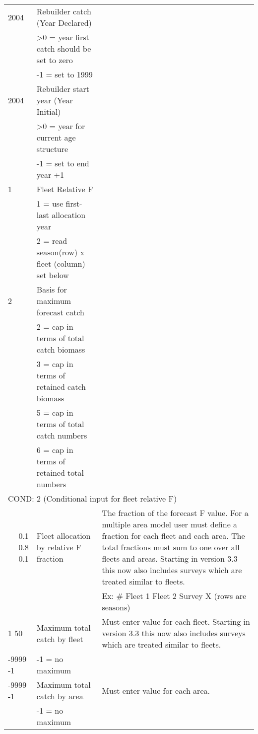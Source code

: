 \begin{landscape}
\begin{longtable}{p{3cm} p{7cm} p{11cm}}
 \hline
 2004 & Rebuilder catch (Year Declared) & \\
      & >0 = year first catch should be set to zero & \\
      & -1 = set to 1999 & \\
      
 \hline
 2004 & Rebuilder start year (Year Initial) & \\
      & >0 = year for current age structure & \\
      & -1 = set to end year +1 & \\
      
 \hline
 1 & Fleet Relative F & \\
   & 1 = use first-last allocation year & \\
   & 2 = read season(row) x fleet (column) set below & \\
   
 \hline
 2 & Basis for maximum forecast catch &  \\
   & 2 = cap in terms of total catch biomass & \\
   & 3 = cap in terms of retained catch biomass & \\
   & 5 = cap in terms of total catch numbers & \\
   & 6 = cap in terms of retained total numbers & \\
 
 \hline  
 \multicolumn{3}{l}{COND: 2 (Conditional input for fleet relative F)} \\
 \multicolumn{1}{r}{0.1 0.8 0.1}  & Fleet allocation by relative F fraction & The fraction of the forecast F value.  For a multiple area model user must define a fraction for each fleet and each area.  The total fractions must sum to one over all fleets and areas.  Starting in version 3.3 this now also includes surveys which are treated similar to fleets.\\
   &  &  Ex: \# Fleet 1  Fleet 2  Survey X (rows are seasons)\\ 
 \pagebreak
 
  1 50 & Maximum total catch by fleet & \multirow{1}{1cm}[-0.1cm]{\parbox{11cm}{Must enter value for each fleet.  Starting in version 3.3 this now also includes surveys which are treated similar to fleets.}} \\
  -9999 -1 & -1 = no maximum & \\
  
  \hline
  -9999 -1 & Maximum total catch by area & \multirow{1}{1cm}[-0.1cm]{\parbox{11cm}{Must enter value for each area.}} \\
     & -1 = no maximum & \\
     

\end{longtable}
\end{landscape}
